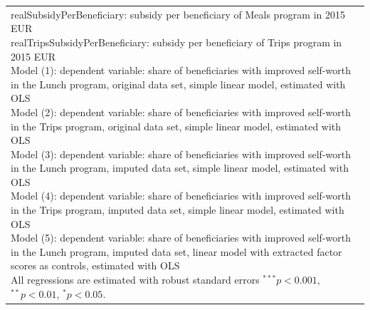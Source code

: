 \begin{frame}[fragile]
\begin{table}
\begin{center}
{\begin{tabular}{l c c c c c }
\hline
\multicolumn{6}{l}{\scriptsize{\parbox{\linewidth}
{\vspace{2pt} realSubsidyPerBeneficiary: subsidy per beneficiary of Meals program in 2015 EUR \\ realTripsSubsidyPerBeneficiary: subsidy per beneficiary of Trips program in 2015 EUR \\Model (1): dependent variable: share of beneficiaries with improved self-worth in the Lunch program, original data set, simple linear model, estimated with OLS \\ Model (2): dependent variable: share of beneficiaries with improved self-worth in the Trips program, original data set, simple linear model, estimated with OLS \\ Model (3): dependent variable: share of beneficiaries with improved self-worth in the Lunch program, imputed data set, simple linear model, estimated with OLS \\ Model (4): dependent variable: share of beneficiaries with improved self-worth in the Trips program, imputed data set, simple linear model, estimated with OLS \\ Model (5): dependent variable: share of beneficiaries with improved self-worth in the Lunch program, imputed data set, linear model with extracted factor scores as controls, estimated with OLS \\ All regressions are estimated with robust standard errors $^{***}p<0.001$, $^{**}p<0.01$, $^*p<0.05$.}}}
\end{tabular}
}
\label{SelfworthRegressions}
\end{center}
\end{table}


\end{frame}

